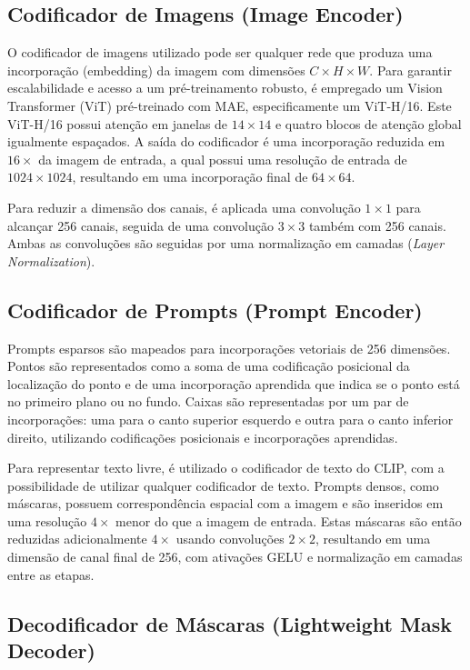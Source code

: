 \subsection{Codificador de Imagens (Image Encoder)}

O codificador de imagens utilizado pode ser qualquer rede que produza uma incorporação (embedding) da imagem com dimensões \(C \times H \times W\). Para garantir escalabilidade e acesso a um pré-treinamento robusto, é empregado um Vision Transformer (ViT) pré-treinado com MAE, especificamente um ViT-H/16. Este ViT-H/16 possui atenção em janelas de \(14 \times 14\) e quatro blocos de atenção global igualmente espaçados. A saída do codificador é uma incorporação reduzida em \(16\times\) da imagem de entrada, a qual possui uma resolução de entrada de \(1024 \times 1024\), resultando em uma incorporação final de \(64 \times 64\).

Para reduzir a dimensão dos canais, é aplicada uma convolução \(1 \times 1\) para alcançar 256 canais, seguida de uma convolução \(3 \times 3\) também com 256 canais. Ambas as convoluções são seguidas por uma normalização em camadas (\textit{Layer Normalization}).

\subsection{Codificador de Prompts (Prompt Encoder)}

Prompts esparsos são mapeados para incorporações vetoriais de 256 dimensões. Pontos são representados como a soma de uma codificação posicional da localização do ponto e de uma incorporação aprendida que indica se o ponto está no primeiro plano ou no fundo. Caixas são representadas por um par de incorporações: uma para o canto superior esquerdo e outra para o canto inferior direito, utilizando codificações posicionais e incorporações aprendidas.

Para representar texto livre, é utilizado o codificador de texto do CLIP, com a possibilidade de utilizar qualquer codificador de texto. Prompts densos, como máscaras, possuem correspondência espacial com a imagem e são inseridos em uma resolução \(4\times\) menor do que a imagem de entrada. Estas máscaras são então reduzidas adicionalmente \(4\times\) usando convoluções \(2 \times 2\), resultando em uma dimensão de canal final de 256, com ativações GELU e normalização em camadas entre as etapas.

\subsection{Decodificador de Máscaras (Lightweight Mask Decoder)}

